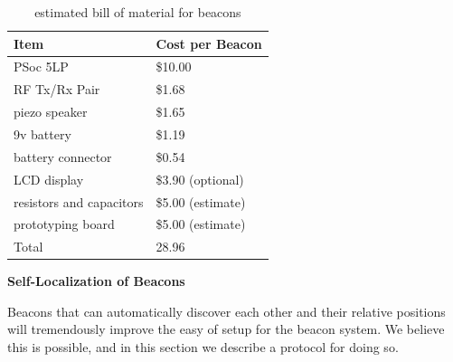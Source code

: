 \documentclass{article}
\begin{document}
      \begin{table}
        \begin{tabular}{|l|l|}
          \hline
          Item & Cost per Beacon \\
          \hline
          PSoc 5LP & \$10.00 \\
          RF Tx/Rx Pair & \$1.68 \\
          piezo speaker & \$1.65 \\
          9v battery & \$1.19 \\
          battery connector & \$0.54 \\
          LCD display & \$3.90 (optional) \\
          resistors and capacitors & \$5.00 (estimate) \\
          prototyping board & \$5.00 (estimate) \\
          \hline
          Total & 28.96 \\
          \hline
        \end{tabular}
        \caption{estimated bill of material for beacons}
        \label{table:beacon_bom}
      \end{table}

      \textbf{Self-Localization of Beacons} \label{section:beacon_self_localization}

      Beacons that can automatically discover each other and their relative positions will tremendously improve the easy of setup for the beacon system. We believe this is possible, and in this section we describe a protocol for doing so.
\end{document}
